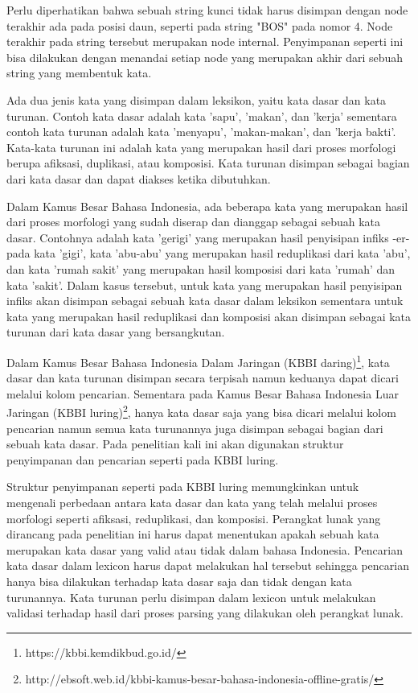Perlu diperhatikan bahwa sebuah string kunci tidak harus disimpan dengan node terakhir ada pada posisi daun, seperti pada string "BOS" pada nomor 4. Node terakhir pada string tersebut merupakan node internal. Penyimpanan seperti ini bisa dilakukan dengan menandai setiap node yang merupakan akhir dari sebuah string yang membentuk kata.

Ada dua jenis kata yang disimpan dalam leksikon, yaitu kata dasar dan kata turunan. Contoh kata dasar adalah kata 'sapu', 'makan', dan 'kerja' sementara contoh kata turunan adalah kata 'menyapu', 'makan-makan', dan 'kerja bakti'. Kata-kata turunan ini adalah kata yang merupakan hasil dari proses morfologi berupa afiksasi, duplikasi, atau komposisi. Kata turunan disimpan sebagai bagian dari kata dasar dan dapat diakses ketika dibutuhkan. 

Dalam Kamus Besar Bahasa Indonesia, ada beberapa kata yang merupakan hasil dari proses morfologi yang sudah diserap dan dianggap sebagai sebuah kata dasar. Contohnya adalah kata 'gerigi' yang merupakan hasil penyisipan infiks -er- pada kata 'gigi', kata 'abu-abu' yang merupakan hasil reduplikasi dari kata 'abu', dan kata 'rumah sakit' yang merupakan hasil komposisi dari kata 'rumah' dan kata 'sakit'. Dalam kasus tersebut, untuk kata yang merupakan hasil penyisipan infiks akan disimpan sebagai sebuah kata dasar dalam leksikon sementara untuk kata yang merupakan hasil reduplikasi dan komposisi akan disimpan sebagai kata turunan dari kata dasar yang bersangkutan.

Dalam Kamus Besar Bahasa Indonesia Dalam Jaringan (KBBI daring)\footnote{https://kbbi.kemdikbud.go.id/}, kata dasar dan kata turunan disimpan secara terpisah namun keduanya dapat dicari melalui kolom pencarian. Sementara pada Kamus Besar Bahasa Indonesia Luar Jaringan (KBBI luring)\footnote{http://ebsoft.web.id/kbbi-kamus-besar-bahasa-indonesia-offline-gratis/}, hanya kata dasar saja yang bisa dicari melalui kolom pencarian namun semua kata turunannya juga disimpan sebagai bagian dari sebuah kata dasar. Pada penelitian kali ini akan digunakan struktur penyimpanan dan pencarian seperti pada KBBI luring.

Struktur penyimpanan seperti pada KBBI luring memungkinkan untuk mengenali perbedaan antara kata dasar dan kata yang telah melalui proses morfologi seperti afiksasi, reduplikasi, dan komposisi. Perangkat lunak yang dirancang pada penelitian ini harus dapat menentukan apakah sebuah kata merupakan kata dasar yang valid atau tidak dalam bahasa Indonesia. Pencarian kata dasar dalam lexicon harus dapat melakukan hal tersebut sehingga pencarian hanya bisa dilakukan terhadap kata dasar saja dan tidak dengan kata turunannya. Kata turunan perlu disimpan dalam lexicon untuk melakukan validasi terhadap hasil dari proses parsing yang dilakukan oleh perangkat lunak. %


